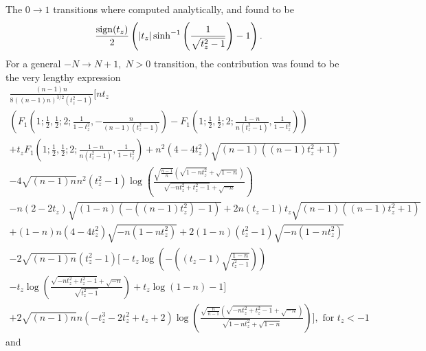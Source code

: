 The \( 0\to 1 \) transitions where computed analytically, and found to be
\begin{equation}
  \label{eq:117}
  \frac{\operatorname{sign}(t_z)}{2}
  \left(
  |t_z| \sinh^{-1}\left(\frac{1}{\sqrt{t_{z}^2-1} }\right) -1
\right  ).
\end{equation}
For a general \( -N \to N+1, \; N>0 \) transition, the contribution was found to be the very lengthy expression
\begin{multline}
  \label{eq:132}
  \frac{(n-1) n }{8
   ((n-1) n)^{3/2} (t_z^2-1)}
 \Bigg[
   n t_z\\
   \left(F_1\left(1;\frac{1}{2},\frac{1}{2};2;\frac{1}{1-t_z^2},-\frac{n}{(n-1)
         (t_z^2-1)}\right)
     -F_1\left(1;\frac{1}{2},\frac{1}{2};2;\frac{1-n}{n
   (t_z^2-1)},\frac{1}{1-t_z^2}\right)\right)\\
+t_z
   F_1\left(1;\frac{1}{2},\frac{1}{2};2;\frac{1-n}{n
       (t_z^2-1)},\frac{1}{1-t_z^2}\right)
   +n^2 (4-4 t_z^2)
   \sqrt{(n-1) ((n-1) t_z^2+1)}\\
   -4 \sqrt{(n-1) n} n^2 (t_z^2-1)
   \log \left(\frac{\sqrt{\frac{n-1}{n}} \left(\sqrt{1-n t_z^2}+\sqrt{1-n}\right)}{\sqrt{-n
         t_z^2+t_z^2-1}+\sqrt{-n}}\right)\\
   -n (2-2 t_z) \sqrt{(1-n) \left(-((n-1)
   t_z^2)-1\right)}+2 n (t_z-1) t_z \sqrt{(n-1) \left((n-1)
 t_z^2+1\right)}\\
+(1-n) n \left(4-4 t_z^2\right) \sqrt{-n \left(1-n
    t_z^2\right)}+2 (1-n) \left(t_z^2-1\right) \sqrt{-n \left(1-n t_z^2\right)}\\
-2
\sqrt{(n-1) n} (t_z^2-1) \Bigg[
-t_z \log \left(-\left((t_z-1)
         \sqrt{\frac{1-n}{t_z^2-1}}\right)\right)\\
     -t_z \log \left(\frac{\sqrt{-n
   t_z^2+t_z^2-1}+\sqrt{-n}}{\sqrt{t_z^2-1}}\right)+t_z \log
(1-n)-1
\Bigg]\\
+2 \sqrt{(n-1) n} n \left(-t_z^3-2 t_z^2+t_z+2\right) \log
   \left(\frac{\sqrt{\frac{n}{n-1}} \left(\sqrt{-n
           t_z^2+t_z^2-1}+\sqrt{-n}\right)}{\sqrt{1-n t_z^2}+\sqrt{1-n}}\right)\Bigg]
, \text{ for  } t_z<-1
\end{multline}
and
